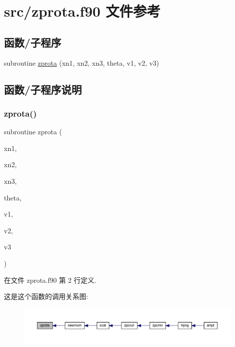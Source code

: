 \hypertarget{zprota_8f90}{}\section{src/zprota.f90 文件参考}
\label{zprota_8f90}
\subsection*{函数/子程序}
\begin{DoxyCompactItemize}
\item 
subroutine \mbox{\hyperlink{zprota_8f90_af4eb2a2c9d14c024f5d1cc8bbfd887ca}{zprota}} (xn1, xn2, xn3, theta, v1, v2, v3)
\end{DoxyCompactItemize}


\subsection{函数/子程序说明}
\mbox{\label{zprota_8f90_af4eb2a2c9d14c024f5d1cc8bbfd887ca}} 
\subsubsection{\texorpdfstring{zprota()}{zprota()}}
{\footnotesize\ttfamily subroutine zprota (\begin{DoxyParamCaption}\item[{}]{xn1,  }\item[{}]{xn2,  }\item[{}]{xn3,  }\item[{}]{theta,  }\item[{}]{v1,  }\item[{}]{v2,  }\item[{}]{v3 }\end{DoxyParamCaption})}



在文件 zprota.\+f90 第 2 行定义.

这是这个函数的调用关系图\+:
\nopagebreak
\begin{figure}[H]
\begin{center}
\leavevmode
\includegraphics[width=350pt]{zprota_8f90_af4eb2a2c9d14c024f5d1cc8bbfd887ca_icgraph}
\end{center}
\end{figure}
